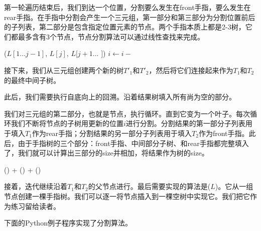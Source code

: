 \documentclass[b5paper]{ctexart}
\begin{document}
第一轮遍历结束后，我们到达一个位置，分割要么发生在front手指，要么发生在rear手指。在手指中分割会产生一个三元组，第一部分和第三部分为分割位置前后的子列表，第二部分是包含指定位置元素的节点。两个手指本质上都是2-3树，它们都最多含有3个节点，节点分割算法可以通过线性查找来完成。

\begin{algorithmic}
      \State \Return ($L[1...j-1]$, $L[j]$, $L[j+1...$  $]$)
    \EndIf
    \State $i \gets i -$ 
  \EndFor
\EndFunction
\end{algorithmic}

接下来，我们从三元组创建两个新的树$T'_1$和$T'_2$，然后将它们连接起来作为$T_1$和$T_2$的最终中间子树。

此后，我们需要执行自底向上的回溯。沿着结果树填入所有尚为空的部分。

我们对三元组的第二部分，也就是节点，执行循环。直到它变为一个叶子。每次循环我们不断将节点的子树用更新的位置$i$进行分割。分割结果的第一部分子列表用于填入$T_1$作为rear手指；分割结果的另一部分子列表用于填入$T_2$作为front手指。此后，由于手指树的三个部分：front手指、中间部分子树、和rear手指都完整填入了，我们就可以计算出三部分的size并相加，将结果作为树的size。

\begin{algorithmic}
  \State \Return {}() + () + ()
\EndFunction
\end{algorithmic}

接着，迭代继续沿着$T_1$和$T_2$的父节点进行。最后需要实现的算法是($L$)。它从一组节点创建一棵手指树。我们可以逐一将节点插入到一棵空树中实现它。我们把它作为练习留给读者。

下面的Python例子程序实现了分割算法。
\end{document}
